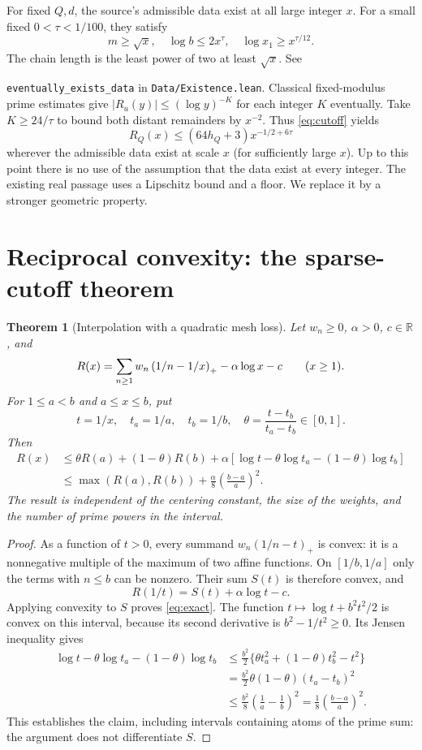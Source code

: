 \documentclass[11pt,a4paper]{article}
\newtheorem{theorem}{Theorem}[section]
\theoremstyle{remark}\newtheorem{remark}[theorem]{Remark}
\newcommand{\R}{\mathbb R}\newcommand{\C}{\mathbb C}\newcommand{\N}{\mathbb N}
\begin{document}
For fixed $Q,d$, the source's admissible data exist at all large integer $x$. For a small fixed $0<\tau<1/100$, they satisfy
\begin{equation}\label{eq:scales}
m\ge\sqrt x,\quad \log b\le2x^\tau,\quad \log x_1\ge x^{\tau/12}.
\end{equation}
The chain length is the least power of two at least $\sqrt x$. See\par\noindent \texttt{eventually\_exists\_data} in \texttt{Data/Existence.lean}. Classical fixed-modulus prime estimates give $|R_u(y)|\le (\log y)^{-K}$ for each integer $K$ eventually. Take $K\ge24/\tau$ to bound both distant remainders by $x^{-2}$. Thus \eqref{eq:cutoff} yields
\begin{equation}\label{eq:power}
R_Q(x)\le (64h_Q+3)x^{-1/2+6\tau}
\end{equation}
wherever the admissible data exist at scale $x$ (for sufficiently large $x$). Up to this point there is no use of the assumption that the data exist at every integer. The existing real passage uses a Lipschitz bound and a floor. We replace it by a stronger geometric property.

\section{Reciprocal convexity: the sparse-cutoff theorem}\label{sec:sparse}
\begin{theorem}[Interpolation with a quadratic mesh loss]\label{thm:interp}
Let $w_n\ge0$, $\alpha>0$, $c\in\R$, and
\[R(x)=\sum_{n\ge1}w_n\left(1/n-1/x\right)_+-\alpha\log x-c\qquad(x\ge1).\]
For $1\le a<b$ and $a\le x\le b$, put
\[t=1/x,\quad t_a=1/a,\quad t_b=1/b,\quad \theta=\frac{t-t_b}{t_a-t_b}\in[0,1].\]
Then
\begin{align}
R(x)&\le\theta R(a)+(1-\theta)R(b)
 +\alpha[\log t-\theta\log t_a-(1-\theta)\log t_b]\label{eq:exact}\\
&\le \max(R(a),R(b))+\frac{\alpha}{8}\left(\frac{b-a}{a}\right)^2.\label{eq:mesh}
\end{align}
The result is independent of the centering constant, the size of the weights, and the number of prime powers in the interval.
\end{theorem}
\begin{proof}
As a function of $t>0$, every summand $w_n(1/n-t)_+$ is convex: it is a nonnegative multiple of the maximum of two affine functions. On $[1/b,1/a]$ only the terms with $n\le b$ can be nonzero. Their sum $S(t)$ is therefore convex, and
\[R(1/t)=S(t)+\alpha\log t-c.\]
Applying convexity to $S$ proves \eqref{eq:exact}. The function $t\mapsto\log t+b^2 t^2/2$ is convex on this interval, because its second derivative is $b^2-1/t^2\ge0$. Its Jensen inequality gives
\begin{align*}
\log t-\theta\log t_a-(1-\theta)\log t_b
&\le \frac{b^2}{2}\{\theta t_a^2+(1-\theta)t_b^2-t^2\}\\
&=\frac{b^2}{2}\theta(1-\theta)(t_a-t_b)^2\\
&\le \frac{b^2}{8}\left(\frac1a-\frac1b\right)^2
=\frac18\left(\frac{b-a}{a}\right)^2.
\end{align*}
This establishes the claim, including intervals containing atoms of the prime sum: the argument does not differentiate $S$.
\end{proof}
\end{document}
